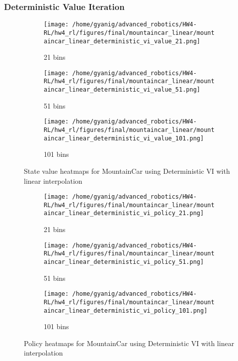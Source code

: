 \documentclass{article}
\begin{document}
\subsubsection{Deterministic Value Iteration}
\begin{figure}[H]
    \centering
    \begin{subfigure}{0.32\textwidth}
        \texttt{[image: /home/gyanig/advanced\_robotics/HW4-RL/hw4\_rl/figures/final/mountaincar\_linear/mountaincar\_linear\_deterministic\_vi\_value\_21.png]}
        \caption{21 bins}
    \end{subfigure}
    \begin{subfigure}{0.32\textwidth}
        \texttt{[image: /home/gyanig/advanced\_robotics/HW4-RL/hw4\_rl/figures/final/mountaincar\_linear/mountaincar\_linear\_deterministic\_vi\_value\_51.png]}
        \caption{51 bins}
    \end{subfigure}
    \begin{subfigure}{0.32\textwidth}
        \texttt{[image: /home/gyanig/advanced\_robotics/HW4-RL/hw4\_rl/figures/final/mountaincar\_linear/mountaincar\_linear\_deterministic\_vi\_value\_101.png]}
        \caption{101 bins}
    \end{subfigure}
    \caption{State value heatmaps for MountainCar using Deterministic VI with linear interpolation}
\end{figure}

\begin{figure}[H]
    \centering
    \begin{subfigure}{0.32\textwidth}
        \texttt{[image: /home/gyanig/advanced\_robotics/HW4-RL/hw4\_rl/figures/final/mountaincar\_linear/mountaincar\_linear\_deterministic\_vi\_policy\_21.png]}
        \caption{21 bins}
    \end{subfigure}
    \begin{subfigure}{0.32\textwidth}
        \texttt{[image: /home/gyanig/advanced\_robotics/HW4-RL/hw4\_rl/figures/final/mountaincar\_linear/mountaincar\_linear\_deterministic\_vi\_policy\_51.png]}
        \caption{51 bins}
    \end{subfigure}
    \begin{subfigure}{0.32\textwidth}
        \texttt{[image: /home/gyanig/advanced\_robotics/HW4-RL/hw4\_rl/figures/final/mountaincar\_linear/mountaincar\_linear\_deterministic\_vi\_policy\_101.png]}
        \caption{101 bins}
    \end{subfigure}
    \caption{Policy heatmaps for MountainCar using Deterministic VI with linear interpolation}
\end{figure}
\end{document}
